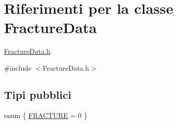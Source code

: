 \hypertarget{classFractureData}{\section{Riferimenti per la classe Fracture\-Data}
\label{classFractureData}
}


\hyperlink{FractureData_8h}{Fracture\-Data.\-h}.  




{\ttfamily \#include $<$Fracture\-Data.\-h$>$}

\subsection*{Tipi pubblici}
\begin{DoxyCompactItemize}
\item 
enum \{ \hyperlink{classFractureData_aaeea1f30482432d159eda9d98beb5e89a351538e4c78b34b5c0416e21903e1812}{F\-R\-A\-C\-T\-U\-R\-E} = 0
 \}
\end{DoxyCompactItemize}

